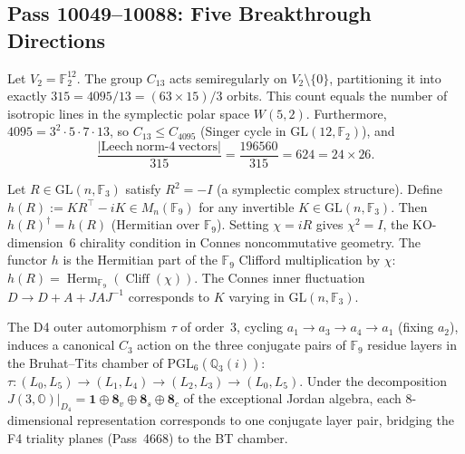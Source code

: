 
\subsection*{Pass 10049--10088: Five Breakthrough Directions}

\begin{theorem}
\label{thm:c315_identity}
Let $V_2 = \mathbb{F}_2^{12}$. The group $C_{13}$ acts semiregularly on
$V_2\setminus\{0\}$, partitioning it into exactly
$315 = 4095/13 = (63 \times 15)/3$ orbits.
This count equals the number of isotropic lines in the symplectic polar space $W(5,2)$.
Furthermore, $4095 = 3^2 \cdot 5 \cdot 7 \cdot 13$, so $C_{13} \leq C_{4095}$
(Singer cycle in $\mathrm{GL}(12,\mathbb{F}_2)$), and
$$\frac{|\mathrm{Leech\ norm\mbox{-}4\ vectors}|}{315} = \frac{196560}{315} = 624 = 24 \times 26.$$
\end{theorem}

\begin{theorem}
\label{thm:f9_ncg_bridge}
Let $R \in \mathrm{GL}(n,\mathbb{F}_3)$ satisfy $R^2 = -I$
(a symplectic complex structure). Define
$h(R) := KR^\top - iK \in M_n(\mathbb{F}_9)$
for any invertible $K \in \mathrm{GL}(n,\mathbb{F}_3)$.
Then $h(R)^\dagger = h(R)$ (Hermitian over $\mathbb{F}_9$).
Setting $\chi = iR$ gives $\chi^2 = I$, the KO-dimension~6 chirality condition
in Connes noncommutative geometry. The functor $h$ is the Hermitian part
of the $\mathbb{F}_9$ Clifford multiplication by $\chi$:
$h(R) = \operatorname{Herm}_{\mathbb{F}_9}(\operatorname{Cliff}(\chi)).$
The Connes inner fluctuation $D \to D + A + JAJ^{-1}$ corresponds to
$K$ varying in $\mathrm{GL}(n,\mathbb{F}_3)$.
\end{theorem}

\begin{theorem}
\label{thm:d4_bt_dictionary}
The D4 outer automorphism $\tau$ of order~3, cycling
$a_1 \to a_3 \to a_4 \to a_1$ (fixing $a_2$), induces a canonical $C_3$ action
on the three conjugate pairs of $\mathbb{F}_9$ residue layers in the Bruhat--Tits
chamber of $\mathrm{PGL}_6(\mathbb{Q}_3(i))$:
$\tau\colon (L_0,L_5) \to (L_1,L_4) \to (L_2,L_3) \to (L_0,L_5).$
Under the decomposition $J(3,\mathbb{O})|_{D_4} = \mathbf{1} \oplus \mathbf{8}_v
\oplus \mathbf{8}_s \oplus \mathbf{8}_c$ of the exceptional Jordan algebra,
each 8-dimensional representation corresponds to one conjugate layer pair,
bridging the F4 triality planes (Pass~4668) to the BT chamber.
\end{theorem}


